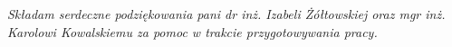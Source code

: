 \newpage
\thispagestyle{empty}
\begin{flushright}
\textit{
Składam serdeczne podziękowania pani dr inż. Izabeli Żółtowskiej oraz\newline
mgr inż. Karolowi Kowalskiemu za pomoc w trakcie przygotowywania pracy.
}
\end{flushright}
\cleardoublepage
